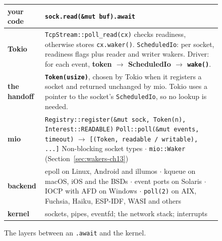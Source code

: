 \begin{figure}[htbp]
    \centering\small
    \begin{tabularx}{\linewidth}{>{\raggedright\arraybackslash}p{2.6cm} Y}
        \toprule
        \textbf{your code} & \texttt{sock.read(\&mut buf).await} \\
        \midrule
        \textcolor{Primary3}{\textbf{Tokio}}  &
            \texttt{TcpStream::poll\_read(cx)} checks readiness, otherwise stores \texttt{cx.waker()}. \newline
            \texttt{ScheduledIo}: per socket, readiness flags plus reader and writer wakers. \newline
            Driver: for each event, \textbf{token $\rightarrow$ ScheduledIo $\rightarrow$ \texttt{wake()}}. \\
        \midrule
        \textcolor{StmtProposition}{\textbf{the handoff}} &
            \textbf{\texttt{Token(usize)}}, chosen by Tokio when it registers a socket and returned unchanged by mio. Tokio uses a pointer to the socket's \texttt{ScheduledIo}, so no lookup is needed. \\
        \midrule
        \textcolor{StmtLemma}{\textbf{mio}}  &
            \texttt{Registry::register(\&mut sock, Token(n), Interest::READABLE)} \newline
            \texttt{Poll::poll(\&mut events, timeout)} $\rightarrow$ \texttt{[(Token, readable / writable), ...]} \newline
            Non-blocking socket types $\cdot$ \texttt{mio::Waker} (Section~\ref{sec:wakers-ch13}) \\
        \midrule
        \textcolor{orange!70!black}{\textbf{backend}}  &
            epoll on Linux, Android and illumos $\cdot$ kqueue on macOS, iOS and the BSDs $\cdot$ event ports on Solaris $\cdot$ IOCP with AFD on Windows $\cdot$ \texttt{poll(2)} on AIX, Fuchsia, Haiku, ESP-IDF, WASI and others \\
        \midrule
        \textbf{kernel} & sockets, pipes, eventfd; the network stack; interrupts \\
        \bottomrule
    \end{tabularx}
    \caption{The layers between an \texttt{.await} and the kernel.}
    \label{fig:wakers-12.1}
\end{figure}

